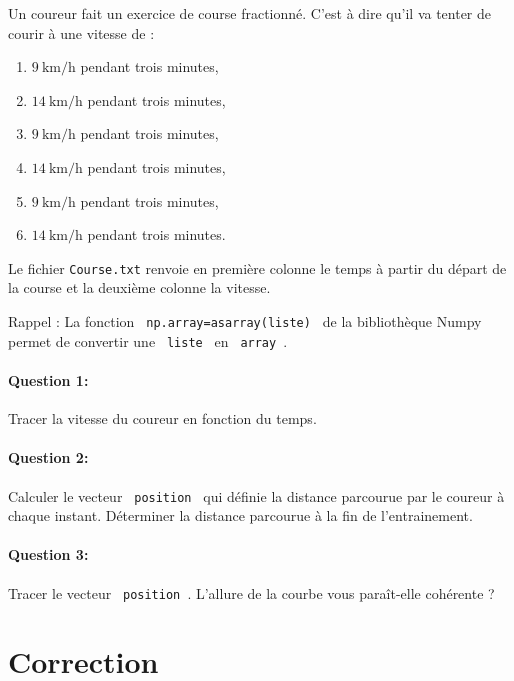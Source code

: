 Un coureur fait un exercice de course fractionné. C'est à dire qu'il va tenter de courir à une vitesse de :
\begin{enumerate}
 \item $\SI{9}{\kilo\meter\per\hour}$ pendant trois minutes,
 \item $\SI{14}{\kilo\meter\per\hour}$ pendant trois minutes,
 \item $\SI{9}{\kilo\meter\per\hour}$ pendant trois minutes,
 \item $\SI{14}{\kilo\meter\per\hour}$ pendant trois minutes,
 \item $\SI{9}{\kilo\meter\per\hour}$ pendant trois minutes,
 \item $\SI{14}{\kilo\meter\per\hour}$ pendant trois minutes.
\end{enumerate}

Le fichier \texttt{Course.txt} renvoie en première colonne le temps à partir du départ de la course et la deuxième colonne la vitesse.

Rappel : La fonction \verb? np.array=asarray(liste) ? de la bibliothèque Numpy permet de convertir une \verb? liste ? en \verb? array ?.

\paragraph{Question 1:} Tracer la vitesse du coureur en fonction du temps. 

\paragraph{Question 2:} Calculer le vecteur \verb? position ? qui définie la distance parcourue par le coureur à chaque instant. Déterminer la distance parcourue à la fin de l'entrainement.

\paragraph{Question 3:} Tracer le vecteur \verb? position ?. L'allure de la courbe vous paraît-elle cohérente ?

\ifdef{\public}{}{}

\newpage

\pagestyle{correction}

\section{Correction}

